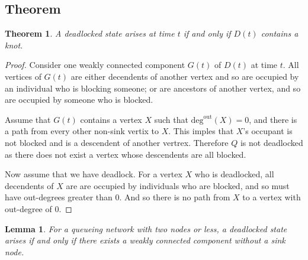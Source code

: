 \documentclass{article}
\newtheorem{theorem}{Theorem}
\newtheorem{lemma}{Lemma}
\begin{document}
\subsection{Theorem}

\begin{theorem}
A deadlocked state arises at time $t$ if and only if $D(t)$ contains a knot.
\end{theorem}

\begin{proof}
Consider one weakly connected component $G(t)$ of $D(t)$ at time $t$.
All vertices of $G(t)$ are either decendents of another vertex and so are occupied by an individual who is blocking someone; or are ancestors of another vertex, and so are occupied by someone who is blocked.

Assume that $G(t)$ contains a vertex $X$ such that $\text{deg}^{\text{out}}(X) = 0$, and there is a path from every other non-sink vertix to $X$.
This imples that $X$'s occupant is not blocked and is a descendent of another vertrex.
Therefore $Q$ is not deadlocked as there does not exist a vertex whose descendents are all blocked.

Now assume that we have deadlock.
For a vertex $X$ who is deadlocked, all decendents of $X$ are are occupied by individuals who are blocked, and so must have out-degrees greater than 0.
And so there is no path from $X$ to a vertex with out-degree of 0.
\end{proof}


\begin{lemma}
For a queueing network with two nodes or less, a deadlocked state arises if and only if there exists a weakly connected component without a sink node.
\end{lemma}
\end{document}

